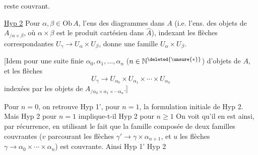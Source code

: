 
reste couvrant.

\uline{Hyp 2} Pour $\alpha,\beta\in\mathrm{Ob}\,A$, l'ens des  diagrammes
\diagram{\begin{tikzcd}[ampersand replacement=\&,column sep=small,row sep=small]\&\alpha\\\gamma\arrow[ur]\arrow[dr]\&\\\&\beta\end{tikzcd}}
dans $A$ (i.e. l'ens. des objets de $A_{/\alpha\times\beta}$, où $\alpha\times\beta$ est le produit cartésien dans $\widehat A$), indexant les flèches correspondantes $U_\gamma\longrightarrow U_\alpha\times U_\beta$, donne une famille  $U_\alpha\times U_\beta$.

[Idem pour une suite finie  $\alpha_0,\alpha_1,\ldots,\alpha_n$ ($n\in\mathbb N^{\deleted{\unsure{*}}}$) d'objets de $A$, et les  flèches
\[U_\gamma\longrightarrow U_{\alpha_0}\times U_{\alpha_1}\times\cdots\times U_{\alpha_n}\]
indexées par les objets de $A_{/\alpha_0\times\alpha_1\times\cdots\alpha_n}$.]

Pour $n=0$, on retrouve Hyp 1', pour $n=1$, la formulation initiale de Hyp 2. Mais Hyp 2 pour $n=1$ implique-t-il Hyp 2 pour  $n\geq1$ On voit qu'il en est ainsi, par récurrence, en utilisant le fait que la famille composée de deux familles couvrantes
($v$ parcourant les flèches $\gamma'\longrightarrow\gamma\times\alpha_{n+1}$, et $u$ les flèches  $\gamma\longrightarrow\alpha_0\times\cdots\times\alpha_n$) est couvrante. Ainsi Hyp 1'  \inserted{$+$} Hyp 2
